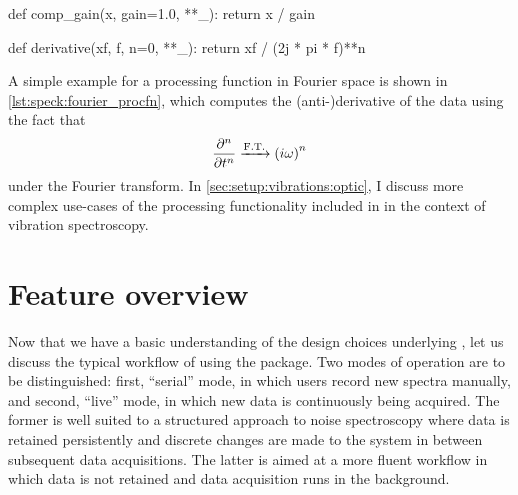 \begin{marginlisting}[*1]
    \begin{pycode}[fontsize=\footnotesize]
        def comp_gain(x, gain=1.0, **_):
            return x / gain
    \end{pycode}
    \caption{
        A simple , which converts amplified data back to the level before amplification.
        Note the token \codev{**\_} variable keyword argument that ensures no errors arise from other parameters being passed to the function.
        More complex processing chains can concisely be defined with  that pipes the output of one function into the input of the next.
    }
    \label{lst:speck:procfn}
\end{marginlisting}
\begin{marginlisting}[*14]
    \begin{pycode}[fontsize=\footnotesize]
        def derivative(xf, f, n=0, **_):
            return xf / (2j * pi * f)**n
    \end{pycode}
    \caption{A simple , which calculates the \mbox{(anti-)}derivative.}
    \label{lst:speck:fourier_procfn}
\end{marginlisting}

A simple example for a processing function in Fourier space is shown in \cref{lst:speck:fourier_procfn}, which computes the \mbox{(anti-)}derivative of the data using the fact that
\begin{align}\label{eq:speck:fourier_derivative}
    \pdv[n]{t} \xrightarrow{\mathrm{F.T.}} \left(i\omega\right)^n
\end{align}
under the Fourier transform.
In \cref{sec:setup:vibrations:optic}, I discuss more complex use-cases of the processing functionality included in \pyspeck in the context of vibration spectroscopy.

\section{Feature overview}\label{sec:speck:software:features}
Now that we have a basic understanding of the design choices underlying \pyspeck, let us discuss the typical workflow of using the package.
Two modes of operation are to be distinguished: first, \enquote{serial} mode, in which users record new spectra manually, and second, \enquote{live} mode, in which new data is continuously being acquired.
The former is well suited to a structured approach to noise spectroscopy where data is retained persistently and discrete changes are made to the system in between subsequent data acquisitions.
The latter is aimed at a more fluent workflow in which data is not retained and data acquisition runs in the background.

